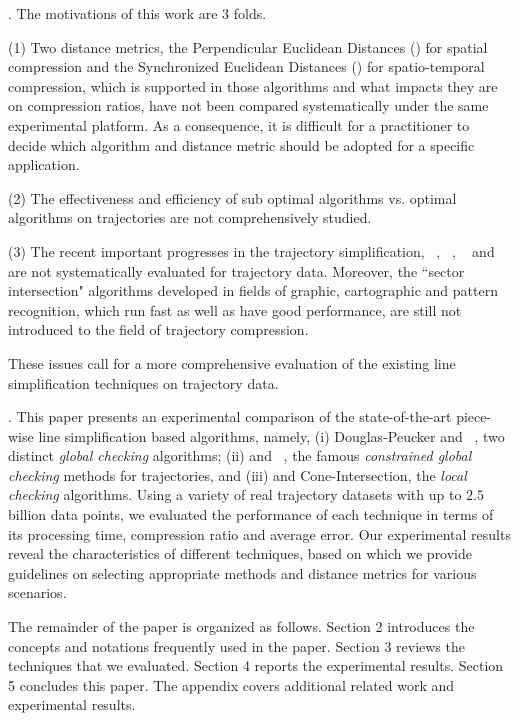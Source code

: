 . The motivations of this work are 3 folds.

\ni (1) Two distance metrics, \ie the Perpendicular Euclidean Distances (\ped) for spatial compression and the Synchronized Euclidean Distances (\sed)\cite{Meratnia:Spatiotemporal} for spatio-temporal compression, which is supported in those algorithms and what impacts they are on compression ratios, have not been compared systematically under the same experimental platform. As a consequence, it is difficult for a practitioner to decide which algorithm and distance metric should be adopted for a specific application.

\ni (2) The effectiveness and efficiency of sub optimal algorithms vs. optimal algorithms on trajectories are not comprehensively studied.

\ni (3) The recent important progresses in the trajectory simplification, \ie \squish~\cite{Muckell:SQUISH}, \bqsa~\cite{Liu:BQS}, \operb~\cite{Lin:Operb} and \cia~\cite{Lin:Cised} are not systematically evaluated for trajectory data. Moreover, the ``sector intersection" algorithms\cite{Williams:Longest, Sklansky:Cone, Dunham:Cone, Zhao:Sleeve} developed in fields of graphic, cartographic and pattern recognition, which run fast as well as have good performance, are still not introduced to the field of trajectory compression.




These issues call for a more comprehensive evaluation of the existing line simplification techniques on trajectory data.

\stitle{\textcolor[rgb]{0.00,0.07,1.00}{Contributions \& Roadmap}}.
This paper presents an experimental comparison of the state-of-the-art piece-wise line simplification based algorithms, namely,
(i) Douglas-Peucker\cite{Douglas:Peucker} and \pavlidis~\cite{Pavlidis:Segment}, two distinct \emph{global checking} algorithms;
(ii) \bqsa\cite{Liu:BQS} and \squishe~\cite{Muckell:SQUISH}, the famous \emph{constrained global checking} methods for trajectories,
and (iii) \operb\cite{Lin:Operb} and Cone-Intersection\cite{Williams:Longest,Sklansky:Cone,Dunham:Cone, Zhao:Sleeve}, the \emph{local checking} algorithms.
%
Using a variety of real trajectory datasets with up to $2.5$ billion data points, we evaluated the performance of each technique in terms of its processing time, compression ratio and average error.
%
Our experimental results reveal the characteristics of different techniques, based on which we provide guidelines on selecting appropriate methods and distance metrics for various scenarios.

The remainder of the paper is organized as follows.
Section 2 introduces the concepts and notations frequently used in the paper.
Section 3 reviews the techniques that we evaluated.
Section 4 reports the experimental results.
Section 5 concludes this paper.
The appendix covers additional related work and experimental results.






